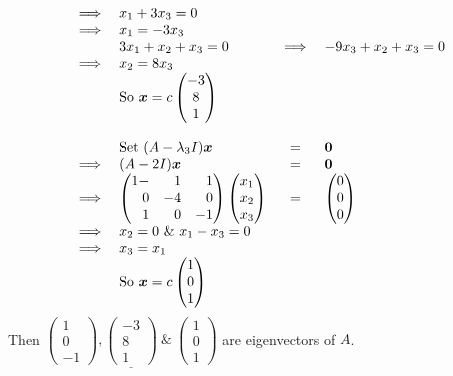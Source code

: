 \documentclass[11pt,a4paper]{article}
\begin{document}
\[\begin{array}{clcl}
\implies& x_1 + 3x_3 = 0\\
\implies& x_1 = -3x_3\\
& 3x_1 + x_2 + x_3 = 0 &\implies& -9x_3 + x_2 + x_3 = 0\\
\implies& x_2 = 8x_3\\
&\mathrm{So\ }\vect{x} = c\begin{pmatrix} -3 \\ 8 \\ 1 \end{pmatrix}\\
\\&\mathrm{Set\ }(A - \lambda_3 I)\vect{x} &=& \vect{0}\\
\implies& (A-2I)\vect{x} &=& \vect{0}\\
\implies& \begin{pmatrix*}[r] 1- & 1 & 1 \\ 0 & -4 & 0 \\ 1 & 0 & -1\end{pmatrix*}\begin{pmatrix} x_1 \\ x_2 \\ x_3 \end{pmatrix} &=& \begin{pmatrix} 0 \\ 0 \\ 0 \end{pmatrix}\\
\implies& x_2 = 0\ \&\ x_1 - x_3 = 0\\
\implies& x_3 = x_1\\
&\mathrm{So\ }\vect{x} = c\begin{pmatrix} 1 \\ 0 \\ 1 \end{pmatrix}
\end{array}\]
Then $\underline{\begin{pmatrix} 1 \\ 0 \\ -1 \end{pmatrix}, \begin{pmatrix} -3 \\ 8 \\ 1 \end{pmatrix}\ \&\ \begin{pmatrix} 1 \\ 0 \\ 1 \end{pmatrix}}$ are eigenvectors of $A$.\\
\end{document}
